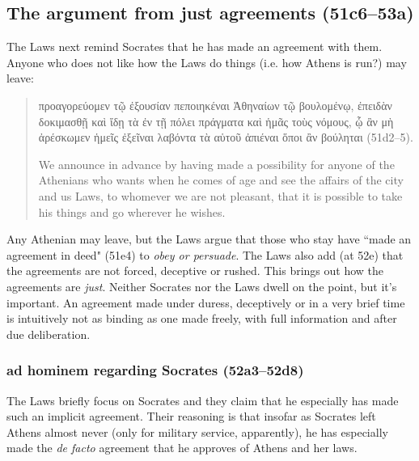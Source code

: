 \documentclass[12pt,letterpaper]{article}
\begin{document}


\subsection*{The argument from just agreements (51c6--53a)}

The Laws next remind Socrates that he has made an agreement with them. Anyone who does not like how the Laws do things (i.e. how Athens is run?) may leave:

\begin{quote}

    \textgreek{προαγορεύομεν τῷ ἐξουσίαν πεποιηκέναι Ἀθηναίων τῷ βουλομένῳ, ἐπειδὰν δοκιμασθῇ καὶ ἴδῃ τὰ ἐν τῇ πόλει πράγματα καὶ ἡμᾶς τοὺς νόμους, ᾧ ἂν μὴ ἀρέσκωμεν ἡμεῖς ἐξεῖναι λαβόντα τὰ αὑτοῦ ἀπιέναι ὅποι ἂν βούληται} (51d2--5).

    We announce in advance by having made a possibility for anyone of the Athenians who wants when he comes of age and see the affairs of the city and us Laws, to whomever we are not pleasant, that it is possible to take his things and go wherever he wishes.

\end{quote}

Any Athenian may leave, but the Laws argue that those who stay have ``made an agreement in deed" (51e4) to \emph{obey or persuade}. The Laws also add (at 52e) that the agreements are not forced, deceptive or rushed. This brings out how the agreements are \emph{just}. Neither Socrates nor the Laws dwell on the point, but it's important. An agreement made under duress, deceptively or in a very brief time is intuitively not as binding as one made freely, with full information and after due deliberation.


\subsubsection*{ad hominem regarding Socrates (52a3--52d8)}

The Laws briefly focus on Socrates and they claim that he especially has made such an implicit agreement. Their reasoning is that insofar as Socrates left Athens almost never (only for military service, apparently), he has especially made the \textit{de facto} agreement that he approves of Athens and her laws.
\end{document}
